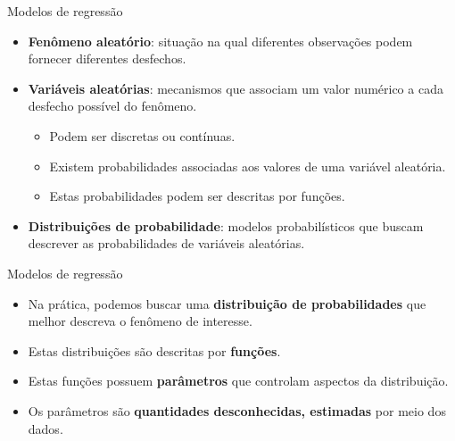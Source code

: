 \documentclass[
  ignorenonframetext,
  serif,
  professionalfont,
  usenames,
  dvipsnames,
  aspectratio = 169]{beamer}
\begin{document}
\begin{frame}{Modelos de regressão}
\protect\hypertarget{modelos-de-regressuxe3o-1}{}
\begin{itemize}
    \itemsep 2ex

  \item \textbf{Fenômeno aleatório}: situação na qual diferentes observações podem fornecer diferentes desfechos. 
  
  \item \textbf{Variáveis aleatórias}: mecanismos que associam um valor numérico a cada desfecho possível do fenômeno. 
  
  \begin{itemize}
    \item Podem ser discretas ou contínuas.
    \item Existem probabilidades associadas aos valores de uma variável aleatória.
    \item Estas probabilidades podem ser descritas por funções.
  \end{itemize}

  \item \textbf{Distribuições de probabilidade}: modelos probabilísticos que buscam descrever as probabilidades de variáveis aleatórias.

  \end{itemize}
\end{frame}

\begin{frame}{Modelos de regressão}
\protect\hypertarget{modelos-de-regressuxe3o-2}{}
\begin{itemize}
    \itemsep 2ex
  
  \item Na prática, podemos buscar uma \textbf{distribuição de probabilidades} que melhor descreva o fenômeno de interesse. 
  
  \item Estas distribuições são descritas por \textbf{funções}. 
  
  \item Estas funções possuem \textbf{parâmetros} que controlam aspectos da distribuição.
  
  \item Os parâmetros são \textbf{quantidades desconhecidas, estimadas} por meio dos dados.
  
  \end{itemize}
\end{frame}
\end{document}
